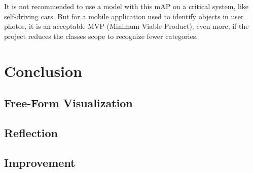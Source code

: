 \documentclass[11pt, a4paper, twocolumn]{article}
\begin{document}
It is not recommended to use a model with this mAP on a critical system, like self-driving cars. But for a mobile application used to identify objects in user photos, it is an acceptable MVP (Minimum Viable Product), even more, if the project reduces the classes scope to recognize fewer categories.

\section{Conclusion}
\subsection{Free-Form Visualization}
\subsection{Reflection}
\subsection{Improvement}


{}
\end{document}
